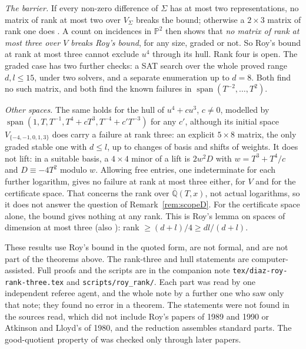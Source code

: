 \documentclass[11pt,a4paper]{article}
\theoremstyle{plain}
\theoremstyle{definition}
\newcommand{\Qbar}{\overline{\mathbb{Q}}}
\newcommand{\spn}{\operatorname{span}}
\begin{document}
\emph{The barrier.} If every non-zero difference of $\Sigma$ has at most two representations,
no matrix of rank at most two over $V_{\Sigma}$ breaks the bound; otherwise a $2\times3$ matrix
of rank one does \cite[Cor.~2]{Roy92}. A count on incidences in $\mathbb{P}^{2}$ then shows that
\emph{no matrix of rank at most three over $V$ breaks Roy's bound}, for any size, graded or not.
So Roy's bound at rank at most three cannot exclude $u^{4}$ through its hull. Rank four is open.
The graded case has two further checks: a SAT search over the whole proved range $d,l\le15$,
under two solvers, and a separate enumeration up to $d=8$. Both find no such matrix, and both
find the known failures in $\spn(T^{-2},\dots,T^{2})$.

\emph{Other spaces.} The same holds for the hull of $u^{4}+cu^{3}$, $c\neq0$, modelled by
$\spn(1,T,T^{-1},T^{4}+cT^{3},T^{-4}+c'T^{-3})$ for any $c'$, although its initial space
$V_{\{-4,-1,0,1,3\}}$ does carry a failure at rank three: an explicit $5\times8$ matrix, the only
graded stable one with $d\le l$, up to changes of basis and shifts of weights. It does not lift: in a
suitable basis, a $4\times4$ minor of a lift is $2w^{2}D$ with $w=T^{3}+T^{4}/c$ and $D\equiv-4T^{2}$ modulo $w$. Allowing
free entries, one indeterminate for each further logarithm, gives no failure at rank at most
three either, for $V$ and for the certificate space. That concerns the rank over $\Qbar(T,x)$,
not actual logarithms, so it does not answer the question of Remark~\ref{rem:scopeD}. For the
certificate space alone, the bound gives nothing at any rank. This is Roy's lemma on spaces of
dimension at most three \cite[Th.~3.4]{Roy95} (also \cite[Exercise~12.10]{Wal00}): rank
$\ge(d+l)/4\ge dl/(d+l)$.

These results use Roy's bound in the quoted form, are not formal, and are not part of the theorems
above. The rank-three and hull statements are computer-assisted. Full proofs and the scripts are in
the companion note \texttt{tex/diaz-roy-rank-three.tex} and \texttt{scripts/roy\_rank/}. Each part
was read by one independent referee agent, and the whole note by a further one who saw only that note;
they found no error in a theorem. The statements were
not found in the sources read, which did not include Roy's papers of 1989 and 1990 or Atkinson and
Lloyd's of 1980, and the reduction assembles standard parts. The good-quotient property of \cite{MFK}
was checked only through later papers.
\end{document}
